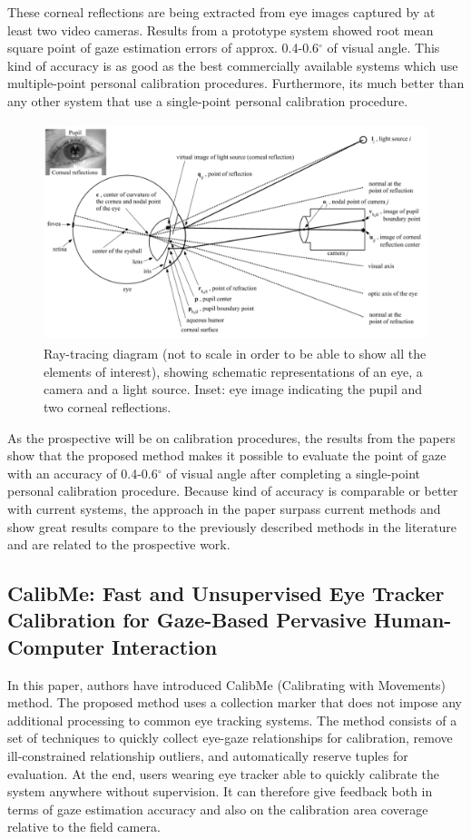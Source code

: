 These corneal reflections are being extracted from eye images captured by at least two video cameras. Results from a prototype system showed root mean square point of gaze estimation errors of approx. 0.4-0.6$^{\circ}$ of visual angle. This kind of accuracy is as good as the best commercially available systems which use multiple-point personal calibration procedures. Furthermore, its much better than any other system that use a single-point personal calibration procedure.

\begin{figure}[!hbt]
  \centering
  \includegraphics[width=4.5in,height=2.5in]{elias.png}
  \caption{Ray-tracing diagram (not to scale in order to be able to show all the elements of interest), showing schematic representations of an eye, a camera and a light source. Inset: eye image indicating the pupil and two corneal reflections.}
  \label{elias}
\end{figure}


As the prospective will be on calibration procedures, the results from the papers show that the proposed method makes it possible to evaluate the point of gaze with an accuracy of 0.4-0.6$^{\circ}$ of visual angle after completing a single-point personal calibration procedure. Because kind of accuracy is comparable or better with current systems, the approach in the paper surpass current methods and show great results compare to the previously described methods in the literature and are related to the prospective work.

\subsection{CalibMe: Fast and Unsupervised Eye Tracker Calibration for Gaze-Based Pervasive Human-Computer Interaction}

In this paper, authors have introduced CalibMe (Calibrating with Movements) method. The proposed method uses a collection marker that does not impose any additional processing to common eye tracking systems. The method consists of a set of techniques to quickly collect eye-gaze relationships for calibration, remove ill-constrained relationship outliers, and automatically reserve tuples for evaluation. At the end,  users wearing eye tracker able to quickly calibrate the system anywhere without supervision. It can therefore give feedback both in terms of gaze estimation accuracy and also on the calibration area coverage relative to the field camera. 

